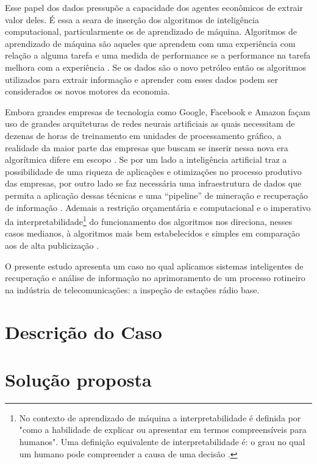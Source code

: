 \documentclass[
	12pt,				%
	openany,			%
	oneside,			%
	a4paper,			%
	english,			%
	french,				%
	spanish,			%
	brazil,				%
	]{abntex2}
\begin{document}
Esse papel dos dados pressupõe a capacidade dos agentes econômicos de extrair
valor deles. É essa a seara de inserção dos algoritmos de inteligência
computacional, particularmente os de aprendizado de máquina. Algoritmos de
aprendizado de máquina são aqueles que aprendem com uma experiência com relação
a alguma tarefa e uma medida de performance se a performance na tarefa melhora
com a experiência \cite{carbonell1984machine}. Se os dados são o novo petróleo
então os algoritmos utilizados para extrair informação e aprender com esses
dados podem ser considerados os novos motores da economia.

Embora grandes empresas de tecnologia como Google, Facebook e Amazon façam uso
de grandes arquiteturas de redes neurais artificiais as quais necessitam de
dezenas de horas de treinamento em unidades de processamento gráfico, a
realidade da maior parte das empresas que buscam se inserir nessa nova era
algorítmica difere em escopo \cite{canziani2016analysis}. Se por um lado a
inteligência artificial traz a possibilidade de uma riqueza de aplicações e
otimizações no processo produtivo das empresas, por outro lado se faz necessária
uma infraestrutura de dados que permita a aplicação dessas técnicas e uma
``pipeline'' de mineração e recuperação de informação
\cite{schutze2007introduction}. Ademais a restrição orçamentária e computacional
e o imperativo da interpretabilidade\footnote{No contexto de aprendizado de
  máquina a interpretabilidade é definida por 
  "como a habilidade de explicar ou apresentar em termos compreensíveis para
  humanos". Uma definição equivalente de interpretabilidade é: o grau no qual um
  humano pode compreender a causa de uma decisão \cite{miller2018explanation}.}
do funcionamento dos algoritmos nos direciona, nesses casos medianos, à
algoritmos mais bem estabelecidos e simples em comparação aos de alta
publicização \cite{dreiseitl2002logistic}.

O presente estudo apresenta um caso no qual aplicamos sistemas inteligentes
de recuperação e análise de informação no aprimoramento de um
processo rotineiro na indústria de telecomunicações: a inspeção de estações
rádio base.

\chapter[Descrição do Caso]{Descrição do Caso}



\chapter[Solução proposta]{Solução proposta}
\end{document}

